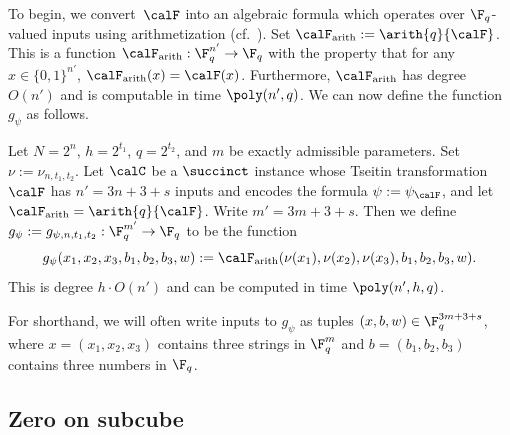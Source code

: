 To begin, we convert~$\calF$ into an algebraic formula which operates over $\F_q$-valued inputs using arithmetization (cf.\ ).
Set $\calF_{\mathrm{arith}} := \arith{q}{\calF}$.
This is a  function $\calF_{\mathrm{arith}}:\F_q^{n'}\rightarrow \F_q$
with the property that for any $x \in \{0, 1\}^{n'}$, $\calF_{\mathrm{arith}}(x) = \calF(x)$.
Furthermore, $\calF_{\mathrm{arith}}$ has degree~$O(n')$ and is computable in time $\poly(n', q)$.
We can now define the function $g_\psi$ as follows.
\begin{definition}\label{def:encoded-function}
Let $N=2^n$, $h = 2^{t_1}$, $q= 2^{t_2}$, and $m$ be exactly admissible parameters.
Set $\nu:=\nu_{n, t_1, t_2}$.
Let $\calC$ be a $\succinct$ instance whose Tseitin transformation~$\calF$
has $n' = 3n + 3 + s$ inputs and encodes the formula $\psi := \psi_{\calF}$,
and let $\calF_{\mathrm{arith}} = \arith{q}{\calF}$.
Write $m' = 3m + 3 + s$.
Then we define $g_\psi := g_{\psi, n, t_1, t_2} : \F_q^{m'} \rightarrow \F_q$ to be the function
\begin{equation*}
g_\psi(x_1, x_2, x_3, b_1, b_2, b_3, w) := \calF_{\mathrm{arith}}(\nu(x_1), \nu(x_2), \nu(x_3), b_1, b_2, b_3, w).
\end{equation*}
This is degree $h \cdot O(n')$ and can be computed in time $\poly(n',h,q)$.
\end{definition}
For shorthand, we will often write inputs to $g_\psi$ as tuples $(x, b, w) \in \F_q^{3m+3+s}$, where $x = (x_1, x_2, x_3)$ contains three strings in $\F_q^m$
and $b = (b_1, b_2, b_3)$ contains three numbers in $\F_q$.

\subsection{Zero on subcube}

